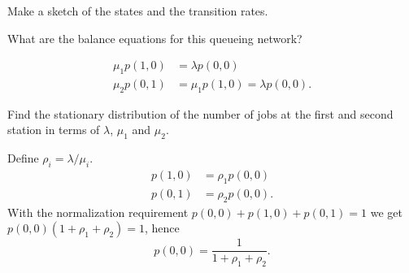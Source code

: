\begin{exercise}[201704]
Make a sketch of the states and the transition rates.
\begin{solution}
 \begin{center}
 
 \end{center}
\end{solution}
\end{exercise}

\begin{exercise}[201704]
What are the balance equations for this queueing network?
\begin{solution}
 \begin{align*}
 \mu_1 p(1,0) &= \lambda p(0,0) \\
 \mu_2 p(0,1) &= \mu_1 p(1,0) = \lambda p(0,0).
 \end{align*}
\end{solution}
\end{exercise}


\begin{exercise}[201704]
 Find the stationary distribution of the number of jobs at the first
 and second station in terms of $\lambda$, $\mu_1$ and $\mu_2$.
\begin{solution}
Define $\rho_i=\lambda/\mu_i$.
 \begin{align*}
 p(1,0) &= \rho_1 p(0,0) \\
 p(0,1) &= \rho_2 p(0,0).
 \end{align*}
With the normalization requirement $p(0,0)+p(1,0)+p(0,1) = 1$ we get
$p(0,0)(1 + \rho_1 + \rho_2) = 1$, hence
\begin{equation*}
p(0,0)=\frac1{1 + \rho_1 + \rho_2}.
\end{equation*}
\end{solution}
\end{exercise}

